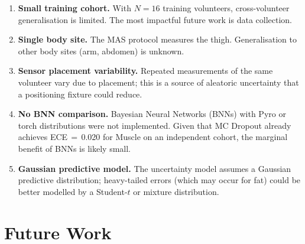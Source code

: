 \documentclass[12pt, a4paper, oneside]{report}
\begin{document}
\begin{enumerate}
  \item \textbf{Small training cohort.} With $N=16$ training volunteers, cross-volunteer generalisation is limited. The most impactful future work is data collection.
  \item \textbf{Single body site.} The MAS protocol measures the thigh. Generalisation to other body sites (arm, abdomen) is unknown.
  \item \textbf{Sensor placement variability.} Repeated measurements of the same volunteer vary due to placement; this is a source of aleatoric uncertainty that a positioning fixture could reduce.
  \item \textbf{No BNN comparison.} Bayesian Neural Networks (BNNs) with Pyro or torch distributions were not implemented. Given that MC Dropout already achieves ECE\,$=$\,0.020 for Muscle on an independent cohort, the marginal benefit of BNNs is likely small.
  \item \textbf{Gaussian predictive model.} The uncertainty model assumes a Gaussian predictive distribution; heavy-tailed errors (which may occur for fat) could be better modelled by a Student-$t$ or mixture distribution.
\end{enumerate}

\section{Future Work}
\label{sec:future_work}
\end{document}
